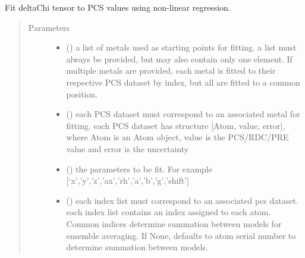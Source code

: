 \documentclass[a4paper,10pt,english]{sphinxmanual}
\begin{document}
\begin{fulllineitems}
\label{\detokenize{reference/generated/paramagpy.fit.nlr_fit_metal_from_pcs:paramagpy.fit.nlr_fit_metal_from_pcs}}
Fit deltaChi tensor to PCS values using non-linear regression.
\begin{quote}\begin{description}
\item[{Parameters}] \leavevmode\begin{itemize}
\item {} 
 () \textendash{} a list of metals used as starting points for fitting.
a list must always be provided, but may also contain
only one element. If multiple metals are provided, each metal
is fitted to their respective PCS dataset by index, but all are
fitted to a common position.

\item {} 
 () \textendash{} each PCS dataset must correspond to an associated metal for fitting.
each PCS dataset has structure {[}Atom, value, error{]}, where Atom is
an Atom object, value is the PCS/RDC/PRE value
and error is the uncertainty

\item {} 
 () \textendash{} the parameters to be fit.
For example {[}‘x’,’y’,’z’,’ax’,’rh’,’a’,’b’,’g’,’shift’{]}

\item {} 
 (\sphinxstyleliteralemphasis{\sphinxupquote{, }}) \textendash{} each index list must correspond to an associated pcs dataset.
each index list contains an index assigned to each atom.
Common indices determine summation between models
for ensemble averaging.
If None, defaults to atom serial number to determine summation
between models.


\end{itemize}
\end{description}
\end{quote}
\end{fulllineitems}
\end{document}
